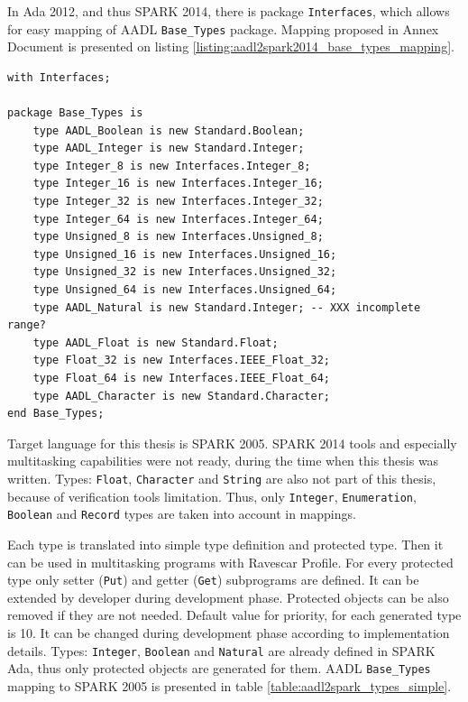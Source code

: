 In Ada 2012, and thus SPARK 2014, there is package \lstinline{Interfaces}, which allows for easy mapping of AADL \lstinline{Base_Types} package. Mapping proposed in Annex Document \cite{AnnexDoc} is presented on listing \ref{listing:aadl2spark2014_base_types_mapping}.

\singlespacing
\begin{lstlisting}[language=aadl, frame=single, gobble=0, caption={Mapping of Base\_Types for SPARK 2014}, label={listing:aadl2spark2014_base_types_mapping}]
with Interfaces;

package Base_Types is
	type AADL_Boolean is new Standard.Boolean;
	type AADL_Integer is new Standard.Integer;
 	type Integer_8 is new Interfaces.Integer_8;
 	type Integer_16 is new Interfaces.Integer_16;
	type Integer_32 is new Interfaces.Integer_32;
	type Integer_64 is new Interfaces.Integer_64;
	type Unsigned_8 is new Interfaces.Unsigned_8;
	type Unsigned_16 is new Interfaces.Unsigned_16;
	type Unsigned_32 is new Interfaces.Unsigned_32;
	type Unsigned_64 is new Interfaces.Unsigned_64;
	type AADL_Natural is new Standard.Integer; -- XXX incomplete range? 
	type AADL_Float is new Standard.Float;
	type Float_32 is new Interfaces.IEEE_Float_32;
	type Float_64 is new Interfaces.IEEE_Float_64;
  	type AADL_Character is new Standard.Character;
end Base_Types;
\end{lstlisting} 
\doublespacing

Target language for this thesis is SPARK 2005. SPARK 2014 tools and especially multitasking capabilities were not ready, during the time when this thesis was written. Types: \lstinline{Float}, \lstinline{Character} and \lstinline{String} are also not part of this thesis, because of verification tools limitation. Thus, only \lstinline{Integer}, \lstinline{Enumeration}, \lstinline{Boolean} and \lstinline{Record} types are taken into account in mappings.

Each type is translated into simple type definition and protected type. Then it can be used in multitasking programs with Ravescar Profile. For every protected type only setter (\lstinline{Put}) and getter (\lstinline{Get}) subprograms are defined. It can be extended by developer during development phase. Protected objects can be also removed if they are not needed. Default value for priority, for each generated type is 10. It can be changed during development phase according to implementation details. Types: \lstinline{Integer}, \lstinline{Boolean} and \lstinline{Natural} are already defined in SPARK Ada, thus only protected objects are generated for them. AADL \lstinline{Base_Types} mapping to SPARK 2005 is presented in table \ref{table:aadl2spark_types_simple}.

